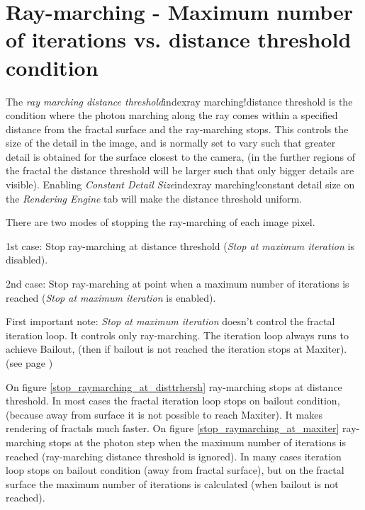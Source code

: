 \section{Ray-marching - Maximum number of iterations vs. distance threshold
	condition}\label{ray-marching---maximum-number-of-iterations-vs.-distance-threshold-condition}

The \emph{ray marching distance threshold}index{ray marching!distance threshold} is the condition where the photon
marching along the ray comes within a specified distance from the fractal
surface and the ray-marching stops. This controls the size of the detail in the
image, and is normally set to vary such that greater detail is obtained for the
surface closest to the camera, (in the further regions of the fractal the
distance threshold will be larger such that only bigger details are visible).
Enabling \emph{Constant Detail Size}index{ray marching!constant detail size} on the \emph{Rendering Engine} tab will
make the distance threshold uniform.

There are two modes of stopping the ray-marching of each image pixel.

1st case: Stop ray-marching at distance threshold (\emph{Stop at maximum
	iteration} is disabled).

2nd case: Stop ray-marching at point when a maximum number of iterations is
reached (\emph{Stop at maximum iteration} is enabled).

First important note: \emph{Stop at maximum iteration} doesn't control the
fractal iteration loop. It controls only ray-marching. The iteration loop always
runs to achieve Bailout, (then if bailout is not reached the iteration stops at
Maxiter). (see page \pageref{bailout-maxiter})

On figure \ref{stop_raymarching_at_disttrhersh} ray-marching stops at distance threshold. In most cases the fractal iteration
loop stops on bailout condition, (because away from surface it is not possible
to reach Maxiter). It makes rendering of fractals much faster.
On figure \ref{stop_raymarching_at_maxiter} ray-marching stops at the photon step when the maximum number of iterations is
reached (ray-marching distance threshold is ignored). In many cases iteration
loop stops on bailout condition (away from fractal surface), but on the fractal
surface the maximum number of iterations is calculated (when bailout is not
reached).

